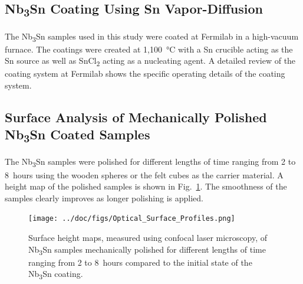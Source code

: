 \documentclass[reprint,amsmath,amssymb,aps]{revtex4-2}%
\begin{document}
%
\subsection{Nb\textsubscript{3}Sn Coating Using Sn Vapor-Diffusion}%
\label{subsec:nb3sncoating}%
The Nb\textsubscript{3}Sn samples used in this study were coated at Fermilab in a high-vacuum furnace. The coatings were created at 1,100~°C with a Sn crucible acting as the Sn source as well as SnCl\textsubscript{2} acting as a nucleating agent. A detailed review of the coating system at Fermilab shows the specific operating details of the coating system\cite{posen2017nb3sn}.

%
\subsection{Surface Analysis of Mechanically Polished Nb\textsubscript{3}Sn Coated Samples}%
\label{subsec:sampleanalysis}%
The Nb\textsubscript{3}Sn samples were polished for different lengths of time ranging from 2 to 8~hours using the wooden spheres or the felt cubes as the carrier material. A height map of the polished samples is shown in Fig.~\ref{fig:opticalsurfaceprofiles}. The smoothness of the samples clearly improves as longer polishing is applied.

\begin{figure}[t]%
\centering%
\texttt{[image: ../doc/figs/Optical\_Surface\_Profiles.png]}%
\caption{Surface height maps, measured using confocal laser microscopy, of Nb\textsubscript{3}Sn samples mechanically polished for different lengths of time ranging from 2 to 8~hours compared to the initial state of the Nb\textsubscript{3}Sn coating.}%
\label{fig:opticalsurfaceprofiles}%
\end{figure}

%
\end{document}
